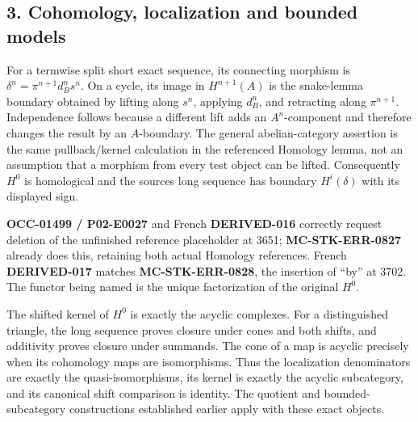 \subsection{\texorpdfstring{3. Cohomology,\allowbreak{} localization and bounded models}{3.  localization and bounded models}}\label{proofs-3487-4161-cohomology-localization-and-bounded-models}

For a termwise split short exact sequence,\allowbreak{} its connecting morphism is \(\delta^n=\pi^{n+1}d_B^ns^n\). On a cycle,\allowbreak{} its image in \(H^{n+1}(A)\) is the snake-lemma boundary obtained by lifting along \(s^n\),\allowbreak{} applying \(d_B^n\),\allowbreak{} and retracting along \(\pi^{n+1}\). Independence follows because a different lift adds an \(A^n\)-component and therefore changes the result by an \(A\)-boundary. The general abelian-category assertion is the same pullback/\allowbreak{}kernel calculation in the referenced Homology lemma,\allowbreak{} not an assumption that a morphism from every test object can be lifted. Consequently \(H^0\) is homological and the source\textquotesingle s long sequence has boundary \(H^i(\delta)\) with its displayed sign.

\textbf{OCC-01499 /\allowbreak{} P02-E0027} and French \textbf{DERIVED-016} correctly request deletion of the unfinished reference placeholder at 3651; \textbf{MC-STK-ERR-0827} already does this,\allowbreak{} retaining both actual Homology references. French \textbf{DERIVED-017} matches \textbf{MC-STK-ERR-0828},\allowbreak{} the insertion of ``by'' at 3702. The functor being named is the unique factorization of the original \(H^0\).

The shifted kernel of \(H^0\) is exactly the acyclic complexes. For a distinguished triangle,\allowbreak{} the long sequence proves closure under cones and both shifts,\allowbreak{} and additivity proves closure under summands. The cone of a map is acyclic precisely when its cohomology maps are isomorphisms. Thus the localization denominators are exactly the quasi-isomorphisms,\allowbreak{} its kernel is exactly the acyclic subcategory,\allowbreak{} and its canonical shift comparison is identity. The quotient and bounded-subcategory constructions established earlier apply with these exact objects.

